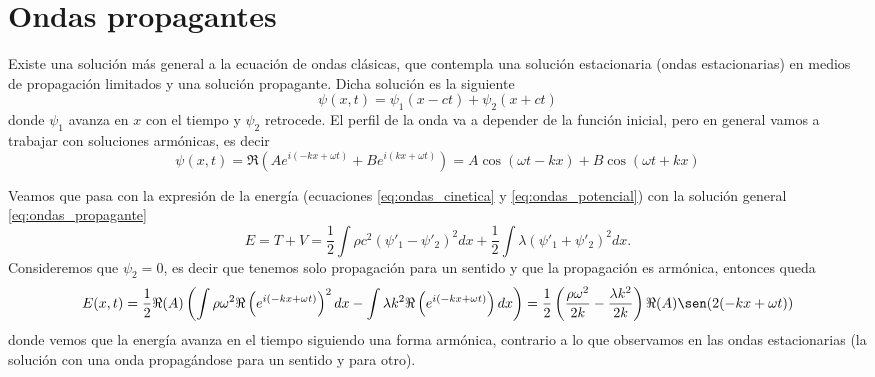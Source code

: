 \documentclass[a4paper,spanish]{article}
\numberwithin{equation}{section}
\begin{document}
\section{Ondas propagantes}
			\label{sec:ondas_propagantes}
			Existe una soluci\'on m\'as general a la ecuaci\'on de ondas cl\'asicas, que contempla una soluci\'on estacionaria (ondas estacionarias) en medios de propagaci\'on limitados y una soluci\'on propagante. Dicha soluci\'on es la siguiente
			\begin{equation}
				\psi(x,t) = \psi_1(x - c t) + \psi_2(x + c t)
				\label{eq:ondas_propagante}
			\end{equation}
			donde $\psi_1$ avanza en $x$ con el tiempo y $\psi_2$ retrocede. El perfil de la onda va a depender de la funci\'on inicial, pero en general vamos a trabajar con soluciones arm\'onicas, es decir
			\begin{equation}
				\psi(x,t) = \Re\left(A e^{i (-k x + \omega t)} + B e^{i (k x + \omega t)}\right) = A \cos(\omega t - k x) + B \cos(\omega t + k x)
				\label{eq:ondas_propagante_armonica}
			\end{equation}
			
			Veamos que pasa con la expresi\'on de la energ\'ia (ecuaciones \ref{eq:ondas_cinetica} y \ref{eq:ondas_potencial}) con la soluci\'on general \ref{eq:ondas_propagante} 
			\[E = T +  V = \frac{1}{2} \int \rho c^2 (\psi'_1 - \psi'_2)^2 dx + \frac{1}{2} \int \lambda (\psi'_1 + \psi'_2)^2 dx.\] Consideremos que $\psi_2 = 0$, es decir que tenemos solo propagaci\'on para un sentido y que la propagaci\'on es arm\'onica, entonces queda 
			\begin{equation}
				E(x,t) = \frac{1}{2} \Re(A) \left( \int \rho \omega^2 \Re\left(e^{i (-k x + \omega t)}\right)^2 dx - \int \lambda k^2 \Re\left(e^{i (-k x + \omega t)}\right) dx \right) = \frac{1}{2} \left(\frac{\rho \omega^2}{2k}-\frac{\lambda k^2}{2k}\right) \Re(A) \sen(2(-kx + \omega t))
			\end{equation}
			donde vemos que la energ\'ia avanza en el tiempo siguiendo una forma arm\'onica, contrario a lo que observamos en las ondas estacionarias (la soluci\'on con una onda propag\'andose para un sentido y para otro).
			
\end{document}
